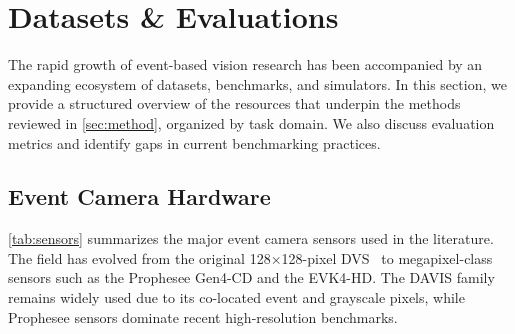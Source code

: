 \section{Datasets \& Evaluations}
\label{sec:data}

The rapid growth of event-based vision research has been accompanied by an expanding ecosystem of datasets, benchmarks, and simulators. In this section, we provide a structured overview of the resources that underpin the methods reviewed in \cref{sec:method}, organized by task domain. We also discuss evaluation metrics and identify gaps in current benchmarking practices.


\subsection{Event Camera Hardware}
\label{sec:data_hardware}

\cref{tab:sensors} summarizes the major event camera sensors used in the literature. The field has evolved from the original 128$\times$128-pixel DVS~\cite{lichtsteiner2008dvs} to megapixel-class sensors such as the Prophesee Gen4-CD and the EVK4-HD. The DAVIS family~\cite{brandli2014davis} remains widely used due to its co-located event and grayscale pixels, while Prophesee sensors dominate recent high-resolution benchmarks.

\begin{table}[t]
\centering
\caption{Major event camera sensors used in the literature.}
\label{tab:sensors}
\end{table}


